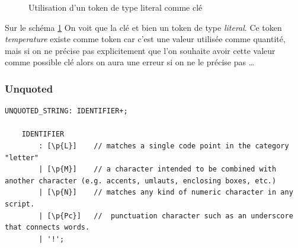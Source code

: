 \documentclass[
    iict, %
    il, %
]{heig-tb}
\begin{document}
\begin{figure}[!h]
    \begin{center}
    \end{center}
    \caption[Utilisation d'un token de type literal comme clé]{\label{literal-key-uon}Utilisation d'un token de type literal comme clé}
\end{figure}

Sur le schéma \ref{literal-key-uon} On voit que la clé et bien un token de type \emph{literal}.
Ce token \emph{temperature} existe comme token car c'est une valeur utilisée comme quantité, mais si on ne précise pas explicitement que l'on souhaite avoir cette valeur
comme possible clé alors on aura une erreur si on ne le précise pas \dots %

\subsubsection{Unquoted}

\begin{lstlisting}[frame=single,caption={Règle concernant les strings sans guillement},label={unquoted}]
    UNQUOTED_STRING: IDENTIFIER+;

    IDENTIFIER
        : [\p{L}]    // matches a single code point in the category "letter"
        | [\p{M}]    // a character intended to be combined with another character (e.g. accents, umlauts, enclosing boxes, etc.)
        | [\p{N}]    // matches any kind of numeric character in any script.
        | [\p{Pc}]   //  punctuation character such as an underscore that connects words.
        | '!';
\end{lstlisting}
\end{document}
